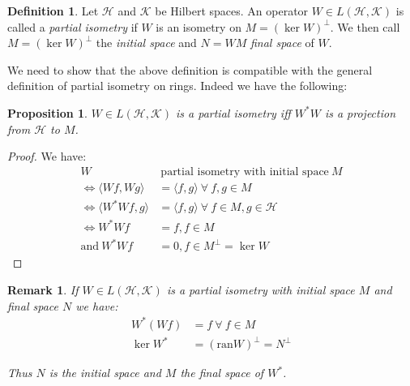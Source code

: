 \documentclass[12pt]{article}
\theoremstyle{definition}
\newtheorem{Def}{Definition}
\theoremstyle{plain}
\newtheorem{Rem}{Remark}
\newtheorem{Prop}{Proposition}
\newcommand{\scal}[2]{\langle #1, #2 \rangle}
\newcommand{\ran}{\mathrm{ran}}
\begin{document}
\begin{Def}
Let $\mathscr{H}$ and $\mathscr{K}$ be Hilbert spaces. An operator $W \in L(\mathscr{H}, \mathscr{K})$ is called a \emph{partial isometry} if $W$ is an isometry on $M = (\ker W)^{\perp}$. We then call $M = (\ker W)^{\perp}$ the \emph{initial space} and $N = WM$ \emph{final space} of $W$.
\end{Def}

We need to show that the above definition is compatible with the general definition of partial isometry on rings. Indeed we have the following:

\begin{Prop}
$W \in L(\mathscr{H},\mathscr{K})$ is a partial isometry iff $W^* W$ is a projection from $\mathscr{H}$ to $M$.
\end{Prop}

\begin{proof}
We have:
\begin{align*}
W & \ \text{partial isometry with initial space} \ M \\
\Leftrightarrow \scal{Wf}{Wg} &= \scal{f}{g} \ \forall \ f,g \in M \\
\Leftrightarrow \scal{W^* W f}{g} &= \scal{f}{g} \ \forall \ f \in M, g \in \mathscr{H} \\
\Leftrightarrow W^* W f &= f, f \in M \\
\text{and} \ W^* W f &= 0, f \in M^{\perp} = \ker W
\end{align*}
\end{proof}

\begin{Rem}
If $W \in L(\mathscr{H}, \mathscr{K})$ is a partial isometry with initial space $M$ and final space $N$ we have:
\begin{align*}
W^* (Wf) &= f \ \forall \ f \in M \\
\ker W^* &= (\ran W)^{\perp} = N^{\perp}
\end{align*}

Thus $N$ is the initial space and $M$ the final space of $W^*$.
\end{Rem}


\end{document}
